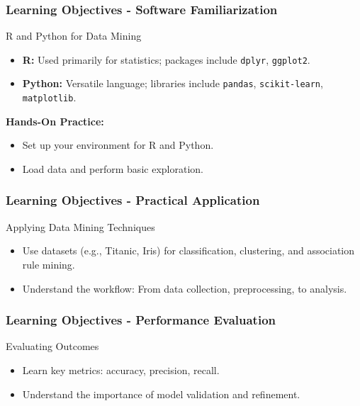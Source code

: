 \documentclass[aspectratio=169]{beamer}
\begin{document}
\begin{frame}[fragile]
    \frametitle{Learning Objectives - Software Familiarization}
    \begin{block}{R and Python for Data Mining}
        \begin{itemize}
            \item \textbf{R:} Used primarily for statistics; packages include \texttt{dplyr}, \texttt{ggplot2}.
            \item \textbf{Python:} Versatile language; libraries include \texttt{pandas}, \texttt{scikit-learn}, \texttt{matplotlib}.
        \end{itemize}
        \textbf{Hands-On Practice:}
        \begin{itemize}
            \item Set up your environment for R and Python.
            \item Load data and perform basic exploration.
        \end{itemize}
    \end{block}
\end{frame}

\begin{frame}[fragile]
    \frametitle{Learning Objectives - Practical Application}
    \begin{block}{Applying Data Mining Techniques}
        \begin{itemize}
            \item Use datasets (e.g., Titanic, Iris) for classification, clustering, and association rule mining.
            \item Understand the workflow: From data collection, preprocessing, to analysis.
        \end{itemize}
    \end{block}
\end{frame}

\begin{frame}[fragile]
    \frametitle{Learning Objectives - Performance Evaluation}
    \begin{block}{Evaluating Outcomes}
        \begin{itemize}
            \item Learn key metrics: accuracy, precision, recall.
            \item Understand the importance of model validation and refinement.
        \end{itemize}
    \end{block}
\end{frame}
\end{document}
